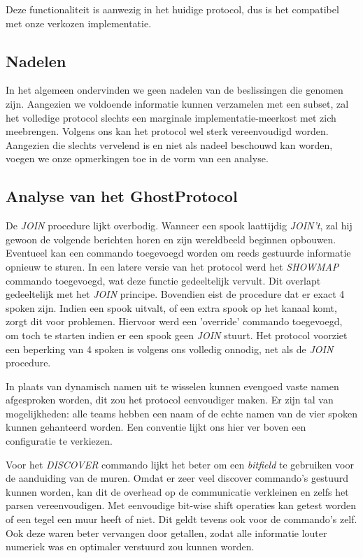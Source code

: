\documentclass[12pt,a4paper]{report}
\begin{document}
Deze functionaliteit is aanwezig in het huidige protocol, dus is het compatibel met onze verkozen implementatie.

\subsection{Nadelen}

In het algemeen ondervinden we geen nadelen van de beslissingen die genomen zijn. Aangezien we voldoende informatie kunnen verzamelen met een subset, zal het volledige protocol slechts een marginale implementatie-meerkost met zich meebrengen. Volgens ons kan het protocol wel sterk vereenvoudigd worden. Aangezien die slechts vervelend is en niet als nadeel beschouwd kan worden, voegen we onze opmerkingen toe in de vorm van een analyse.

\subsection{Analyse van het GhostProtocol}

De \emph{JOIN} procedure lijkt overbodig. Wanneer een spook laattijdig \emph{JOIN't}, zal hij gewoon de volgende berichten horen en zijn wereldbeeld beginnen opbouwen. Eventueel kan een commando toegevoegd worden om reeds gestuurde informatie opnieuw te sturen. In een latere versie van het protocol werd het \emph{SHOWMAP} commando toegevoegd, wat deze functie gedeeltelijk vervult. Dit overlapt gedeeltelijk met het \emph{JOIN} principe. Bovendien eist de procedure dat er exact 4 spoken zijn. Indien een spook uitvalt, of een extra spook op het kanaal komt, zorgt dit voor problemen. Hiervoor werd een 'override' commando toegevoegd, om toch te starten indien er een spook geen \emph{JOIN} stuurt. Het protocol voorziet een beperking van 4 spoken is volgens ons volledig onnodig, net als de \emph{JOIN} procedure. 

In plaats van dynamisch namen uit te wisselen kunnen evengoed vaste namen afgesproken worden, dit zou het protocol eenvoudiger maken. Er zijn tal van mogelijkheden: alle teams hebben een naam of de echte namen van de vier spoken kunnen gehanteerd worden. Een conventie lijkt ons hier ver boven een configuratie te verkiezen.

Voor het \emph{DISCOVER} commando lijkt het beter om een \emph{bitfield} te gebruiken voor de aanduiding van de muren. Omdat er zeer veel discover commando's gestuurd kunnen worden, kan dit de overhead op de communicatie verkleinen en zelfs het parsen vereenvoudigen. Met eenvoudige bit-wise shift operaties kan getest worden of een tegel een muur heeft of niet. Dit geldt tevens ook voor de commando's zelf. Ook deze waren beter vervangen door getallen, zodat alle informatie louter numeriek was en optimaler verstuurd zou kunnen worden.
\end{document}
